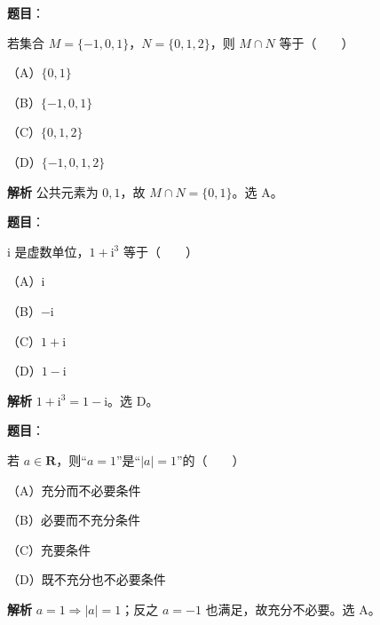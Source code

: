 
\begin{answer}

\textbf{题目}：

若集合 $M=\{-1,0,1\}$，$N=\{0,1,2\}$，则 $M\cap N$ 等于\mbox{（　　）}

（A）$\{0,1\}$

（B）$\{-1,0,1\}$

（C）$\{0,1,2\}$

（D）$\{-1,0,1,2\}$

\textbf{解析}
公共元素为 $0,1$，故 $M\cap N=\{0,1\}$。选 A。


\end{answer}
\begin{answer}

\textbf{题目}：

$\mathrm i$ 是虚数单位，$1+\mathrm i^3$ 等于\mbox{（　　）}

（A）$\mathrm i$

（B）$-\mathrm i$

（C）$1+\mathrm i$

（D）$1-\mathrm i$

\textbf{解析}
$1+\mathrm i^3=1-\mathrm i$。选 D。


\end{answer}
\begin{answer}

\textbf{题目}：

若 $a\in\mathbf R$，则“$a=1$”是“$|a|=1$”的\mbox{（　　）}

（A）充分而不必要条件

（B）必要而不充分条件

（C）充要条件

（D）既不充分也不必要条件

\textbf{解析}
$a=1\Rightarrow|a|=1$；反之 $a=-1$ 也满足，故充分不必要。选 A。


\end{answer}
